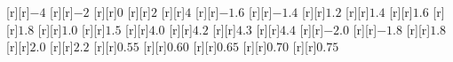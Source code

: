 \begin{psfrags}
%
[r][r]{$-4\!$}%
[r][r]{$-2$}%
[r][r]{$0$}%
[r][r]{$2$}%
[r][r]{$4$}%
[r][r]{$-1.6$}%
[r][r]{$-1.4$}%
[r][r]{$1.2$}%
[r][r]{$1.4$}%
[r][r]{$1.6$}%
[r][r]{$1.8\!$}%
[r][r]{$1.0$}%
[r][r]{$1.5$}%
[r][r]{$4.0$}%
[r][r]{$4.2$}%
[r][r]{$4.3$}%
[r][r]{$4.4$}%
[r][r]{$-2.0$}%
[r][r]{$-1.8$}%
[r][r]{$1.8$}%
[r][r]{$2.0\!$}%
[r][r]{$2.2$}%
[r][r]{$0.55$}%
[r][r]{$0.60$}%
[r][r]{$0.65$}%
[r][r]{$0.70$}%
[r][r]{$0.75$}%
%
%
\end{psfrags}%
%
